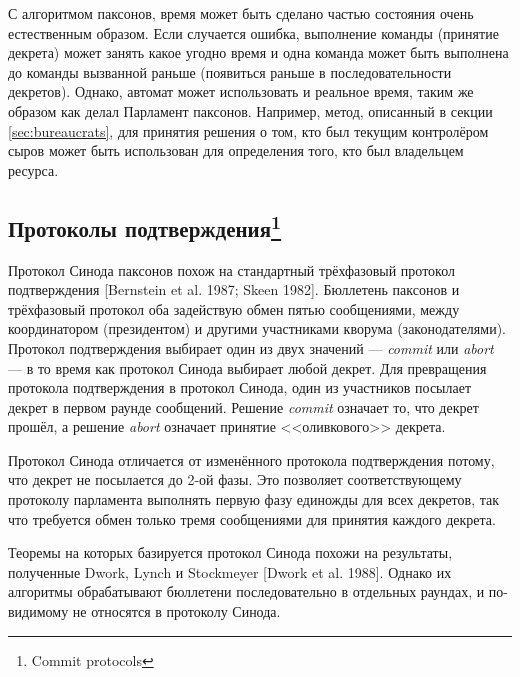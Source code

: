 \documentclass[12pt, a4paper]{article} %
\begin{document}
С алгоритмом паксонов, время может быть сделано частью состояния очень естественным образом. Если случается ошибка, выполнение команды (принятие декрета) может занять какое угодно время и одна команда может быть выполнена до команды вызванной раньше (появиться раньше в последовательности декретов). Однако, автомат может использовать и реальное время, таким же образом как делал Парламент паксонов. Например, метод, описанный в секции \ref{sec:bureaucrats}, для принятия решения о том, кто  был текущим контролёром сыров может быть использован для определения того, кто был владельцем ресурса.

\subsection{Протоколы подтверждения\footnote{Commit protocols}}

Протокол Синода паксонов похож на стандартный трёхфазовый протокол подтверждения [Bernstein et al. 1987; Skeen 1982]. Бюллетень паксонов и трёхфазовый протокол оба задействую обмен пятью сообщениями, между координатором (президентом) и другими участниками кворума (законодателями). Протокол подтверждения выбирает один из двух значений --- \textit{commit} или \textit{abort} --- в то время как протокол Синода выбирает любой декрет. Для превращения протокола подтверждения в протокол Синода, один из участников посылает декрет в первом раунде сообщений. Решение \textit{commit} означает то, что декрет прошёл, а решение \textit{abort} означает принятие <<оливкового>> декрета.

Протокол Синода отличается от изменённого протокола подтверждения потому, что декрет не посылается до 2-ой фазы. Это позволяет соответствующему протоколу парламента выполнять первую фазу единожды для всех декретов, так что требуется обмен только тремя сообщениями для принятия каждого декрета. 

Теоремы на которых базируется протокол Синода похожи на результаты, полученные Dwork, Lynch и Stockmeyer [Dwork et al. 1988]. Однако их алгоритмы обрабатывают бюллетени последовательно в отдельных раундах, и по-видимому не относятся в протоколу Синода.
\end{document}

